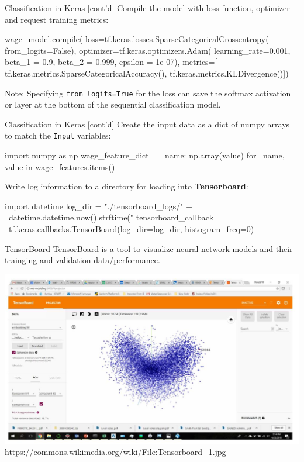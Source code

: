\documentclass[ignorenonframetext,xcolor=x11names]{beamer}
\begin{document}
\begin{frame}[fragile]{Classification in Keras \small [cont'd]}
Compile the model with loss function, optimizer and request training metrics:
\begin{pythoncode}
wage_model.compile(
    loss=tf.keras.losses.SparseCategoricalCrossentropy(
       from_logits=False),
    optimizer=tf.keras.optimizers.Adam(
        learning_rate=0.001,
        beta_1 = 0.9,
        beta_2 = 0.999,
        epsilon = 1e-07),
    metrics=[
        tf.keras.metrics.SparseCategoricalAccuracy(), 
        tf.keras.metrics.KLDivergence()])
\end{pythoncode}
Note: Specifying \texttt{from\_logits=True} for the loss can save the softmax activation or layer at the bottom of the sequential classification model.
\end{frame}

\begin{frame}[fragile]{Classification in Keras \small [cont'd]}
Create the input data as a dict of numpy arrays to match the \texttt{Input} variables:
\begin{pythoncode}
import numpy as np
wage_feature_dict = \
    {name: np.array(value) for \
        name, value in wage_features.items()}
\end{pythoncode}
Write log information to a directory for loading into \textbf{Tensorboard}:
\begin{pythoncode}
import datetime
log_dir = "./tensorboard_logs/" + \
    datetime.datetime.now().strftime("%
tensorboard_callback = \
    tf.keras.callbacks.TensorBoard(log_dir=log_dir, 
        histogram_freq=0)
\end{pythoncode}
\end{frame}

\begin{frame}{TensorBoard}
TensorBoard is a tool to visualize neural network models and their trainging and validation data/performance.

\vspace{\baselineskip}
\centering
\includegraphics[width=.8\textwidth]{Tensorboard_1.jpg} \\

\scriptsize \url{https://commons.wikimedia.org/wiki/File:Tensorboard_1.jpg}

\end{frame}
\end{document}
